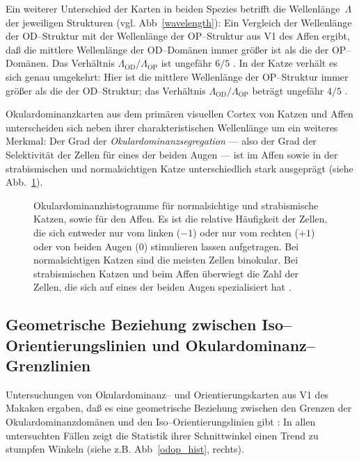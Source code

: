 Ein weiterer Unterschied der Karten in beiden Spezies betrifft die
Wellenlänge~$\Lambda$ der jeweiligen Strukturen
(vgl. Abb~\ref{wavelength}): Ein Vergleich der Wellenlänge der
OD--Struktur mit der Wellenlänge der OP--Struktur aus V1 des Affen ergibt,
daß die mittlere Wellenlänge der OD--Domänen immer größer ist als die
der OP--Domänen.  Das Verhältnis
$\Lambda_{\text{OD}}/\Lambda_{\text{OP}}$ ist ungefähr $6/5$
\cite{oby:1993b}. In der Katze verhält es sich genau umgekehrt: Hier ist
die mittlere Wellenlänge der OP--Struktur immer größer als die der
OD--Struktur; das Verhältnis $\Lambda_{\text{OD}}/\Lambda_{\text{OP}}$
beträgt ungefähr $4/5$ \cite{loewel:1988}.

Okulardominanzkarten aus dem primären visuellen Cortex von Katzen und
Affen unterscheiden sich neben ihrer charakteristischen Wellenlänge um ein
weiteres Merkmal: Der Grad der \emph{Okulardominanzsegregation} --- also
der Grad der Selektivität der Zellen für eines der beiden Augen --- ist
im Affen sowie in der strabismischen und normalsichtigen Katze
unterschiedlich stark ausgeprägt (siehe Abb.~\ref{okuhist}).

\begin{figure}[t]
\begin{center}
\end{center}
\caption{Okulardominanzhistogramme für normalsichtige und strabismische
Katzen, sowie für den Affen. Es ist die relative Häufigkeit der Zellen,
die sich entweder nur vom linken ($-1$) oder nur vom rechten ($+1$) oder
von beiden Augen ($0$) stimulieren lassen aufgetragen. Bei normalsichtigen
Katzen sind die meisten Zellen binokular. Bei strabismischen Katzen und
beim Affen überwiegt die Zahl der Zellen, die sich auf eines der beiden
Augen spezialisiert hat \protect{}.}
\label{okuhist}
\end{figure}

\subsection[Geometrische Beziehung zwischen
Iso--Orientierungslinien$\ldots$]{Geometrische Beziehung zwischen
Iso--Orientierungslinien und Okulardominanz--Grenzlinien}
\label{90grad}

Untersuchungen von Okulardominanz-- und Orientierungskarten aus V1 des
Makaken ergaben, daß es eine geometrische Beziehung zwischen den Grenzen
der Okulardominanzdomänen und den Iso--Orientierungslinien gibt
\cite{bartfield:1992,oby:1993b}: In allen untersuchten Fällen zeigt die
Statistik ihrer Schnittwinkel einen Trend zu stumpfen Winkeln (siehe
z.B. Abb~\ref{odop_hist}, rechts).

